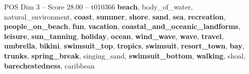 \begin{textsample}{POS Dim 3 – Score 28.00 – t010366}  \label{ex:f3_pos_009}
\textbf{beach}, body\_of\_water, natural\_environment, \textbf{coast}, \textbf{summer}, \textbf{shore}, \textbf{sand}, \textbf{sea}, \textbf{recreation}, \textbf{people\_on\_beach}, \textbf{fun}, \textbf{vacation}, \textbf{coastal\_and\_oceanic\_landforms}, \textbf{leisure}, \textbf{sun\_tanning}, \textbf{holiday}, \textbf{ocean}, \textbf{wind\_wave}, \textbf{wave}, \textbf{travel}, \textbf{umbrella}, \textbf{bikini}, \textbf{swimsuit\_top}, \textbf{tropics}, \textbf{swimsuit}, \textbf{resort\_town}, \textbf{bay}, \textbf{trunks}, \textbf{spring\_break}, singing\_sand, \textbf{swimsuit\_bottom}, \textbf{walking}, shoal, \textbf{barechestedness}, caribbean

\end{textsample}
